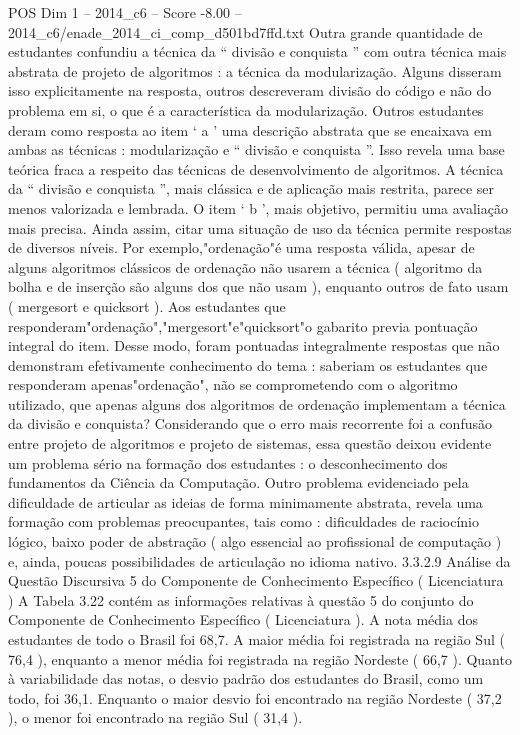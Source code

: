 \begin{textsample}{POS Dim 1 – 2014\_c6 – Score -8.00 – 2014\_c6/enade\_2014\_ci\_comp\_d501bd7ffd.txt}
Outra grande quantidade de estudantes confundiu a técnica da “ divisão e conquista ” com outra técnica mais abstrata de projeto de algoritmos : a técnica da modularização.
Alguns disseram isso explicitamente na resposta, outros descreveram divisão do código e não do problema em si, o que é a característica da modularização.
Outros estudantes deram como resposta ao item ‘ a ’ uma descrição abstrata que se encaixava em ambas as técnicas : modularização e “ divisão e conquista ”.
Isso revela uma base teórica fraca a respeito das técnicas de desenvolvimento de algoritmos.
A técnica da “ divisão e conquista ”, mais clássica e de aplicação mais restrita, parece ser menos valorizada e lembrada.
O item ‘ b ’, mais objetivo, permitiu uma avaliação mais precisa.
Ainda assim, citar uma situação de uso da técnica permite respostas de diversos níveis.
Por exemplo,"ordenação"é uma resposta válida, apesar de alguns algoritmos clássicos de ordenação não usarem a técnica ( algoritmo da bolha e de inserção são alguns dos que não usam ), enquanto outros de fato usam ( mergesort e quicksort ).
Aos estudantes que responderam"ordenação","mergesort"e"quicksort"o gabarito previa pontuação integral do item.
Desse modo, foram pontuadas integralmente respostas que não demonstram efetivamente conhecimento do tema : saberiam os estudantes que responderam apenas"ordenação", não se comprometendo com o algoritmo utilizado, que apenas alguns dos algoritmos de ordenação implementam a técnica da divisão e conquista?
Considerando que o erro mais recorrente foi a confusão entre projeto de algoritmos e projeto de sistemas, essa questão deixou evidente um problema sério na formação dos estudantes : o desconhecimento dos fundamentos da Ciência da Computação.
Outro problema evidenciado pela dificuldade de articular as ideias de forma minimamente abstrata, revela uma formação com problemas preocupantes, tais como : dificuldades de raciocínio lógico, baixo poder de abstração ( algo essencial ao profissional de computação ) e, ainda, poucas possibilidades de articulação no idioma nativo. 3.3.2.9 Análise da Questão Discursiva 5 do Componente de Conhecimento Específico ( Licenciatura ) A Tabela 3.22 contém as informações relativas à questão 5 do conjunto do Componente de Conhecimento Específico ( Licenciatura ).
A nota média dos estudantes de todo o Brasil foi 68,7.
A maior média foi registrada na região Sul ( 76,4 ), enquanto a menor média foi registrada na região Nordeste ( 66,7 ).
Quanto à variabilidade das notas, o desvio padrão dos estudantes do Brasil, como um todo, foi 36,1.
Enquanto o maior desvio foi encontrado na região Nordeste ( 37,2 ), o menor foi encontrado na região Sul ( 31,4 ).

\end{textsample}
